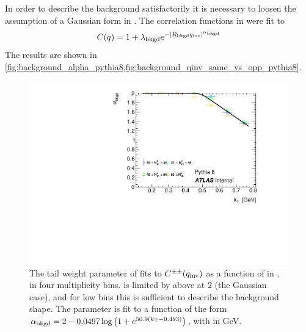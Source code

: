 In order to describe the background satisfactorily it is necessary to loosen the assumption of a Gaussian form in \qinv.
The \qinv correlation functions in \PYEight were fit to
\begin{equation} C(q) = 1 + \lambda_{\mathrm{bkgd}} e^{-|R_{\mathrm{bkgd}} q_{\mathrm{inv}}|^{\alpha_{\mathrm{bkgd}}}} \end{equation}
The results are shown in \cref{fig:background_alpha_pythia8,fig:background_qinv_same_vs_opp_pythia8}.

\begin{figure}[t]
\centering
\includegraphics{qinv_backAlpha_vs_kt_pythia8.pdf}
\caption{The tail weight parameter \abkgd of fits to $C^{\pm\pm}(q_{\mathrm{inv}})$ as a function of \kt in , in four multiplicity bins. \abkgd is limited by above at 2 (the Gaussian case), and for low \kt bins this is sufficient to describe the background shape. The parameter is fit to a function of the form $\alpha_{\mathrm{bkgd}} = 2 - 0.0497 \log \left(1 + e^{50.9(k_\mathrm{T} - 0.493)} \right)$, with \kt in GeV.
}
\label{fig:background_alpha_pythia8}
\end{figure}

